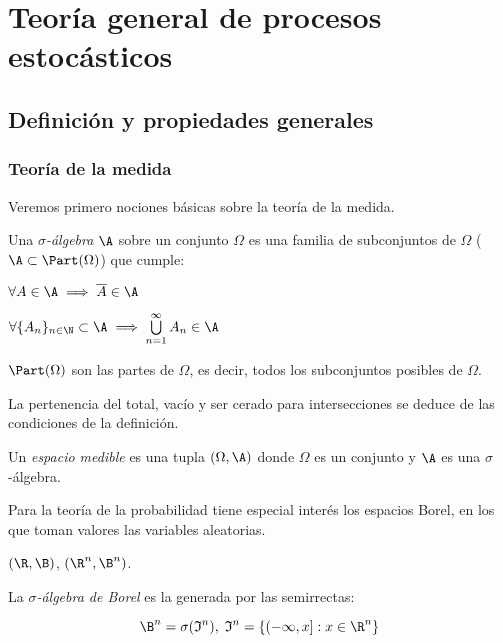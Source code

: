 \section{Teoría general de procesos estocásticos}

\subsection{Definición y propiedades generales}

\subsubsection{Teoría de la medida}

Veremos primero nociones básicas sobre la teoría de la medida.

\begin{ndef}
  Una \emph{$\sigma$-álgebra} $\A$ sobre un conjunto $\Omega$ es una familia de subconjuntos de $\Omega$ ($\A \subset \Part(\Omega)$) que cumple:

  \begin{nlist}
    \item $\forall A \in \A \implies \overline{A} \in \A$
    \item $\forall \{A_n\}_{n \in \N} \subset \A \implies \bigcup \limits^\infty_{n = 1} A_n \in \A$
  \end{nlist}
\end{ndef}

\begin{nota}
  $\Part(\Omega)$ son las partes de $\Omega$, es decir, todos los subconjuntos posibles de $\Omega$.
\end{nota}

La pertenencia del total, vacío y ser cerado para intersecciones se deduce de las condiciones de la definición.

\begin{ndef}
  Un \emph{espacio medible} es una tupla $(\Omega, \A)$ donde $\Omega$ es un conjunto y $\A$ es una $\sigma$-álgebra.
\end{ndef}

Para la teoría de la probabilidad tiene especial interés los espacios Borel, en los que toman valores las variables aleatorias.

\begin{ejemplo}
  $(\R, \B)$, $(\R^n, \B^n)$.
\end{ejemplo}

\begin{ndef}
  La \emph{$\sigma$-álgebra de Borel} es la generada por las semirrectas:

  $$\B^n = \sigma(\mathfrak{I}^n), \; \mathfrak{I}^n = \{ (-\infty, x]: x \in \R^n \}$$
\end{ndef}

